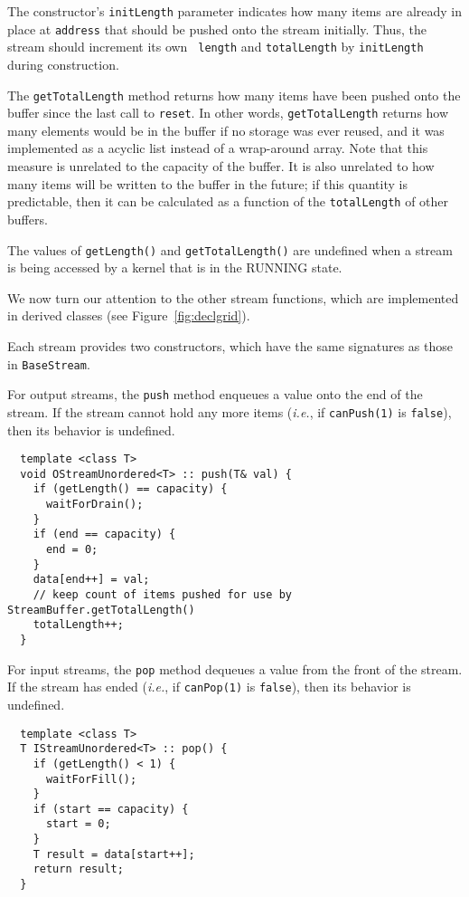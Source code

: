 The constructor's {\tt initLength} parameter indicates how many items
are already in place at {\tt address} that should be pushed onto the
stream initially. Thus, the stream should increment its own {\tt
length} and {\tt totalLength} by {\tt initLength} during construction.

The {\tt getTotalLength} method returns how many items have been
pushed onto the buffer since the last call to {\tt reset}.  In other
words, {\tt getTotalLength} returns how many elements would be in the
buffer if no storage was ever reused, and it was implemented as a
acyclic list instead of a wrap-around array.  Note that this measure
is unrelated to the capacity of the buffer.  It is also unrelated to
how many items will be written to the buffer in the future; if this
quantity is predictable, then it can be calculated as a function of
the {\tt totalLength} of other buffers.

The values of {\tt getLength()} and {\tt getTotalLength()} are
undefined when a stream is being accessed by a kernel that is in the
RUNNING state.

We now turn our attention to the other stream functions, which are
implemented in derived classes (see Figure~\ref{fig:declgrid}).

 Each stream provides two constructors, which have
the same signatures as those in {\tt BaseStream}.

 For output streams, the {\tt push} method enqueues a value
onto the end of the stream.  If the stream cannot hold any more items
({\it i.e.}, if {\tt canPush(1)} is {\tt false}), then its behavior is
undefined.

{\small
\begin{verbatim}
  template <class T>
  void OStreamUnordered<T> :: push(T& val) {
    if (getLength() == capacity) {
      waitForDrain();
    }
    if (end == capacity) {
      end = 0;
    }
    data[end++] = val;
    // keep count of items pushed for use by StreamBuffer.getTotalLength()
    totalLength++;
  }
\end{verbatim}}

 For input streams, the {\tt pop} method dequeues a value
from the front of the stream.  If the stream has ended ({\it i.e.}, if
{\tt canPop(1)} is {\tt false}), then its behavior is undefined.

{\small
\begin{verbatim}
  template <class T>
  T IStreamUnordered<T> :: pop() {
    if (getLength() < 1) {
      waitForFill();
    }
    if (start == capacity) {
      start = 0;
    }
    T result = data[start++];
    return result;
  }
\end{verbatim}}


